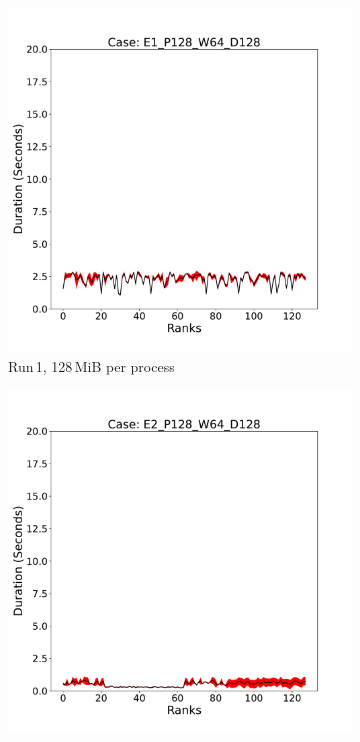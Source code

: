 \begin{figure}
     \centering
     \begin{subfigure}[b]{0.3\textwidth}
         \centering
         \includegraphics[width=\textwidth, height=\textwidth]{figures/deisa2__E1_P128_W64_D128.pdf}
         \caption{Run\,1, 128\,MiB per process}
         \label{fig:E1_128_d2}
     \end{subfigure}
     \hfill
     \begin{subfigure}[b]{0.3\textwidth}
         \centering
         \includegraphics[width=\textwidth, height=\textwidth]{figures/deisa2__E2_P128_W64_D128.pdf}

\end{subfigure}
\end{figure}
